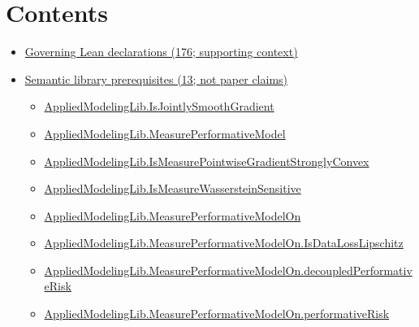 \documentclass[10pt]{article}
\begin{document}
\section*{Contents}
\begin{itemize}[leftmargin=1.2em]
\item \hyperlink{governing-declaration-section-5ef5ef0364b6939c}{Governing Lean declarations (176; supporting context)}
\item \hyperlink{library-section-858f18808007153a}{Semantic library prerequisites (13; not paper claims)}
\begin{itemize}[leftmargin=1.2em]
\item \hyperlink{library-prerequisite-2e05b739f5b71f23}{Applied\allowbreak{}Modeling\allowbreak{}Lib.\allowbreak{}Is\allowbreak{}Jointly\allowbreak{}Smooth\allowbreak{}Gradient}
\item \hyperlink{library-prerequisite-96553d4fbb82f1ac}{Applied\allowbreak{}Modeling\allowbreak{}Lib.\allowbreak{}Measure\allowbreak{}Performative\allowbreak{}Model}
\item \hyperlink{library-prerequisite-b41cbb32daa3dce7}{Applied\allowbreak{}Modeling\allowbreak{}Lib.\allowbreak{}Is\allowbreak{}Measure\allowbreak{}Pointwise\allowbreak{}Gradient\allowbreak{}Strongly\allowbreak{}Convex}
\item \hyperlink{library-prerequisite-3c6dd4ad7ac116e3}{Applied\allowbreak{}Modeling\allowbreak{}Lib.\allowbreak{}Is\allowbreak{}Measure\allowbreak{}Wasserstein\allowbreak{}Sensitive}
\item \hyperlink{library-prerequisite-e14cc5e8b1e1460e}{Applied\allowbreak{}Modeling\allowbreak{}Lib.\allowbreak{}Measure\allowbreak{}Performative\allowbreak{}Model\allowbreak{}On}
\item \hyperlink{library-prerequisite-0de79b655cc05174}{Applied\allowbreak{}Modeling\allowbreak{}Lib.\allowbreak{}Measure\allowbreak{}Performative\allowbreak{}Model\allowbreak{}On.\allowbreak{}Is\allowbreak{}Data\allowbreak{}Loss\allowbreak{}Lipschitz}
\item \hyperlink{library-prerequisite-25221c4f931beacb}{Applied\allowbreak{}Modeling\allowbreak{}Lib.\allowbreak{}Measure\allowbreak{}Performative\allowbreak{}Model\allowbreak{}On.\allowbreak{}decoupled\allowbreak{}Performative\allowbreak{}Risk}
\item \hyperlink{library-prerequisite-8eef8d8ba05e7ebe}{Applied\allowbreak{}Modeling\allowbreak{}Lib.\allowbreak{}Measure\allowbreak{}Performative\allowbreak{}Model\allowbreak{}On.\allowbreak{}performative\allowbreak{}Risk}

\end{itemize}
\end{itemize}
\end{document}
